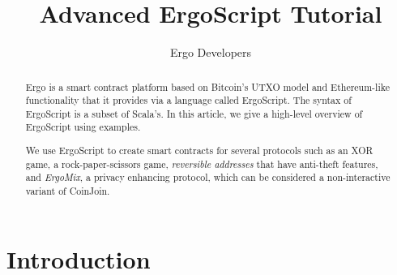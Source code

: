 \documentclass[11pt]{article}
\newcommand{\langname}{ErgoScript\xspace}
\newcommand{\mixname}{ErgoMix\xspace}
\begin{document}
\title{Advanced \langname Tutorial}


\author{Ergo Developers}


\maketitle


\begin{abstract}
Ergo is a smart contract platform based on Bitcoin's UTXO model and Ethereum-like functionality that it provides via a language called \langname. The syntax of \langname is a subset of Scala's. In this article, we give a high-level overview of \langname using examples.



We use \langname to create smart contracts for several protocols such as an XOR game, a rock-paper-scissors game, {\em reversible addresses} that have anti-theft features, and {\em \mixname}, a privacy enhancing protocol, which can be considered a non-interactive variant of CoinJoin. %

\end{abstract}

\section{Introduction}
\end{document}
